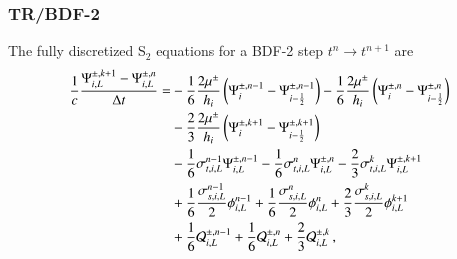 \documentclass[preprint,12pt]{elsarticle}
\begin{document}
\subsubsection{TR/BDF-2}
The fully discretized S$_2$ equations for a BDF-2 step
$t^{n}\rightarrow t^{n+1}$ are
\begin{equation}\lequ{S2BDF2fullL}\begin{split}
  \frac{1}{c}\frac{\Psi\iL^{\pm,k+1}-\Psi\iL^{\pm,n}}{\dt} = &
   -\sixth     \frac{2\mu^\pm}{h_i}\fn{\Psi^{\pm,n-1}_i - \Psi^{\pm,n-1}_{i-\half}}
   -\sixth     \frac{2\mu^\pm}{h_i}\fn{\Psi^{\pm,n}_i   - \Psi^{\pm,n}_{i-\half}}\\
  &-\frac{2}{3}\frac{2\mu^\pm}{h_i}\fn{\Psi^{\pm,k+1}_i - \Psi^{\pm,k+1}_{i-\half}}\\
  &-\sixth\sigma_{t,i,L}^{n-1}\Psi\iL^{\pm,n-1}
   -\sixth\sigma_{t,i,L}^{n}  \Psi\iL^{\pm,n}
   -\frac{2}{3}\sigma_{t,i,L}^k\Psi\iL^{\pm,k+1}\\
  &+\sixth\frac{\sigma_{s,i,L}^{n-1}}{2}\phi\iL^{n-1}
   +\sixth\frac{\sigma_{s,i,L}^{n}}{2}  \phi\iL^{n}
   +\frac{2}{3}\frac{\sigma_{s,i,L}^k}{2}\phi\iL^{k+1}\\
  &+\sixth\Q_{i,L}^{\pm,n-1}
   +\sixth\Q_{i,L}^{\pm,n}
   +\frac{2}{3}\Q_{i,L}^{\pm,k} \pec
\end{split}\end{equation}
\end{document}
